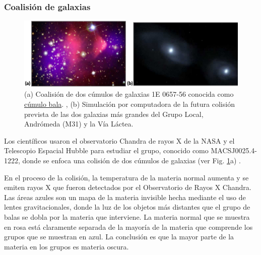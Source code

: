 \subsubsection{Coalisión de galaxias}
\begin{figure}[h]
\centering
\includegraphics[width=.7\textwidth]{Fisica_de_Particulas/imagenes/fritz2.png}
\caption{
(a) Coalisión de dos cúmulos de galaxias 1E 0657-56 conocida como \href{https://en.wikipedia.org/wiki/Bullet_Cluster}{cúmulo bala}. %
, (b) Simulación por computadora de la futura colisión prevista de las dos galaxias más grandes del Grupo Local, Andrómeda (M31) y la Vía Láctea. %
}
\label{coalision}
\end{figure}
Los científicos usaron el observatorio Chandra de rayos X de la NASA y el Telescopio Espacial Hubble para estudiar el grupo, conocido como MACSJ0025.4-1222, donde se enfoca una colisión de dos cúmulos de galaxias (ver Fig. \ref{coalision}a)%
. 

En el proceso de la colisión, la temperatura de la materia normal aumenta y se emiten rayos X que fueron detectados por el Observatorio de Rayos X Chandra. Las áreas azules son un mapa de la materia invisible hecha mediante el uso de lentes gravitacionales, donde la luz de los objetos más distantes que el grupo de balas se dobla por la materia que interviene. La materia normal que se muestra en rosa está claramente separada de la mayoría de la materia que comprende los grupos que se muestran en azul. La conclusión es que la mayor parte de la materia en los grupos es materia oscura\cite{marsh_strings_2019}.


